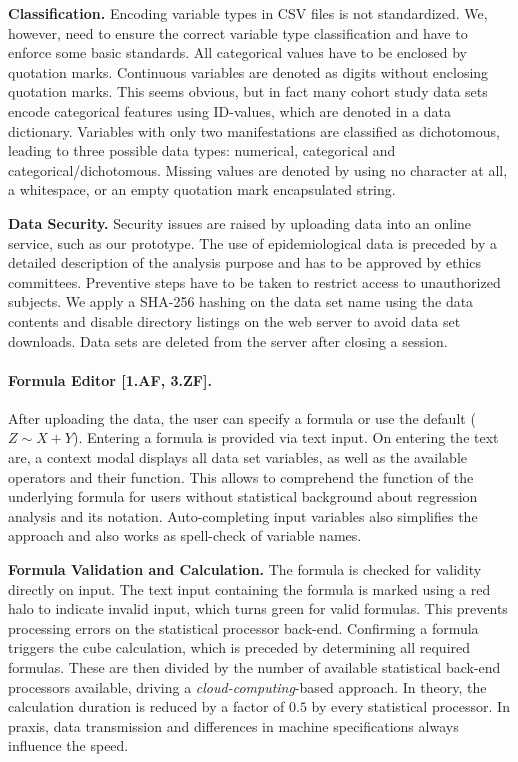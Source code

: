 \documentclass[journal]{style/vgtc} 			          %
\begin{document}
\textbf{Classification.}
Encoding variable types in CSV files is not standardized.
We, however, need to ensure the correct variable type classification and have to enforce some basic standards.
All categorical values have to be enclosed by quotation marks.
Continuous variables are denoted as digits without enclosing quotation marks.
This seems obvious, but in fact many cohort study data sets encode categorical features using ID-values, which are denoted in a data dictionary.
Variables with only two manifestations are classified as dichotomous, leading to three possible data types: numerical, categorical and categorical/dichotomous.
Missing values are denoted by using no character at all, a whitespace, or an empty quotation mark encapsulated string.

\textbf{Data Security.}
Security issues are raised by uploading data into an online service, such as our prototype.
The use of epidemiological data is preceded by a detailed description of the analysis purpose and has to be approved by ethics committees.
Preventive steps have to be taken to restrict access to unauthorized subjects.
We apply a SHA-256 hashing on the data set name using the data contents and disable directory listings on the web server to avoid data set downloads.
Data sets are deleted from the server after closing a session.

\paragraph{Formula Editor [1.AF, 3.ZF].}
After uploading the data, the user can specify a formula or use the default ($Z \sim X + Y$).
Entering a formula is provided via text input.
On entering the text are, a context modal displays all data set variables, as well as the available operators and their function.
This allows to comprehend the function of the underlying formula for users without statistical background about regression analysis and its notation.
Auto-completing input variables also simplifies the approach and also works as spell-check of variable names.

\textbf{Formula Validation and Calculation.} The formula is checked for validity directly on input.
The text input containing the formula is marked using a red halo to indicate invalid input, which turns green for valid formulas.
This prevents processing errors on the statistical processor back-end.
Confirming a formula triggers the cube calculation, which is preceded by determining all required formulas.
These are then divided by the number of available statistical back-end processors available, driving a \emph{cloud-computing}-based approach.
In theory, the calculation duration is reduced by a factor of $0.5$ by every statistical processor.
In praxis, data transmission and differences in machine specifications always influence the speed.
\end{document}
